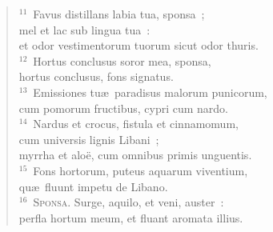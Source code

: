 \begin{verse}
${}^{11}$~Favus distillans labia tua, sponsa~;\\ mel et lac sub lingua tua~:\\ et odor vestimentorum tuorum sicut odor thuris.\\
${}^{12}$~Hortus conclusus soror mea, sponsa,\\ hortus conclusus, fons signatus.\\
${}^{13}$~Emissiones tu\ae\ paradisus malorum punicorum,\\ cum pomorum fructibus, cypri cum nardo.\\
${}^{14}$~Nardus et crocus, fistula et cinnamomum,\\ cum universis lignis Libani~;\\ myrrha et alo\"e, cum omnibus primis unguentis.\\
${}^{15}$~Fons hortorum, puteus aquarum viventium,\\ qu\ae\ fluunt impetu de Libano.\\
${}^{16}$~\textsc{Sponsa.} Surge, aquilo, et veni, auster~:\\ perfla hortum meum, et fluant aromata illius.\end{verse}


